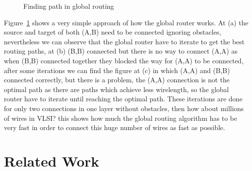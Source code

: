 \documentclass[conference]{IEEEtran}
\begin{document}
\begin{figure}
{
}
\caption{Finding path in global routing}
\label{fig:GlobalRoutingProcess}
\end{figure}

Figure~\ref{fig:GlobalRoutingProcess} shows a very simple approach of how the global router works. At (a) the source and target of both (A,B) need to be connected ignoring obstacles, nevertheless we can observe that the global router have to iterate to get the best routing paths, at (b) (B,B) connected but there is no way to connect (A,A) as when (B,B) connected together they blocked the way for (A,A) to be connected, after some iterations we can find the figure at (c) in which (A,A) and (B,B) connected correctly, but there is a problem, the (A,A) connection is not the optimal path as there are paths which achieve less wirelength, so the global router have to iterate until reaching the optimal path. These iterations are done for only two connections in one layer without obstacles, then how about millions of wires in VLSI? this shows how much the global routing algorithm has to be very fast in order to connect this huge number of wires as fast as possible.



\section{Related Work}
\end{document}
